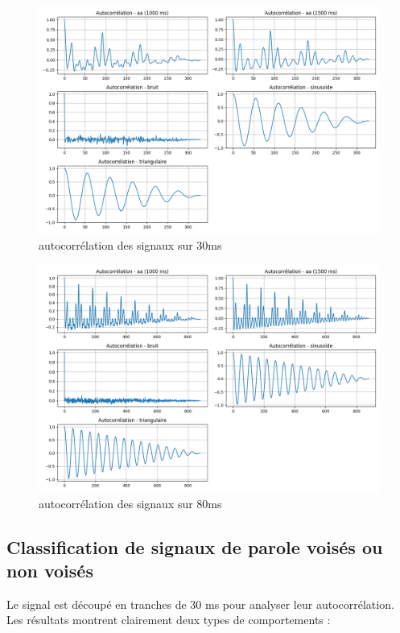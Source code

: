 \begin{figure}[!h]
\centering
\includegraphics[width=17cm]{screenshots/autocorr_signaux_30ms.png}
\caption{autocorrélation des signaux sur 30ms} 
\end{figure} 

\begin{figure}[!h]
\centering
\includegraphics[width=17cm]{screenshots/autocorr_signaux_80ms.png}
\caption{autocorrélation des signaux sur 80ms} 
\end{figure}

\newpage
\subsection{Classification de signaux de parole voisés ou non voisés}

Le signal est découpé en tranches de 30 ms pour analyser leur autocorrélation. Les résultats montrent clairement deux types de comportements :

